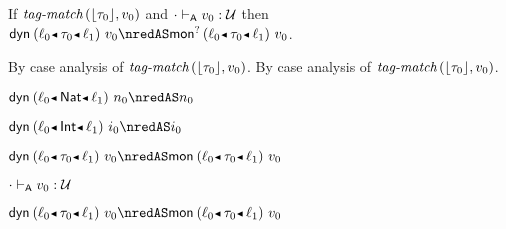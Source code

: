 \begin{lemma}\label{A-dyn-mopt}
  If\/ $\textit{tag-match}\,(\lfloor \tau_0 \rfloor,v_0)$
  and\/ ${\cdot} \vdash_{\mathsf{A}} v_0 : {\mathcal U}$
  then\/ $\edynb{\obnd{\sowner_0}{\stype_0}{\sowner_1}}{\svalue_0} \nredAS \emopt{\obnd{\sowner_0}{\stype_0}{\sowner_1}}{\svalue_0}$.
\end{lemma}{
  \newcommand{\shortpf}{By case analysis of $\fshallow{\tagof{\stype_0}}{\svalue_0}$.}
\begin{lamportproof*}
  \shortpf
\mainproof
  \shortpf

    \begin{pfproof}
      \qedstep
        \begin{pfproof}
          $\edynb{\obnd{\sowner_0}{\tnat}{\sowner_1}}{\snat_0} \nredAS \snat_0$
        \end{pfproof}
    \end{pfproof}

    \begin{pfproof}
      \qedstep
        \begin{pfproof}
          $\edynb{\obnd{\sowner_0}{\tint}{\sowner_1}}{\sint_0} \nredAS \sint_0$
        \end{pfproof}
    \end{pfproof}

    \begin{pfproof}
      \qedstep
        \begin{pfproof}
          $\edynb{\obnd{\sowner_0}{\stype_0}{\sowner_1}}{\svalue_0} \nredAS \emon{\obnd{\sowner_0}{\stype_0}{\sowner_1}}{\svalue_0}$
        \end{pfproof}
    \end{pfproof}

    \begin{pfproof}
      \absurdstep
        \begin{pfproof}
          ${\cdot} \vdash_{\mathsf{A}} v_0 : {\mathcal U}$
        \end{pfproof}
    \end{pfproof}

    \begin{pfproof}
      $\edynb{\obnd{\sowner_0}{\stype_0}{\sowner_1}}{\svalue_0} \nredAS \emon{\obnd{\sowner_0}{\stype_0}{\sowner_1}}{\svalue_0}$
    \end{pfproof}


\end{lamportproof*}}
